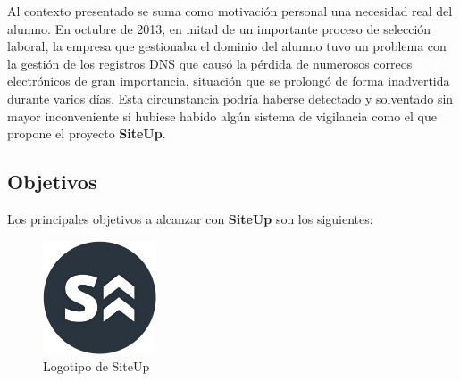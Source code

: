 \documentclass[a4paper,12pt]{article}
\begin{document}
Al contexto presentado se suma como motivación personal una necesidad real del
alumno. En octubre de 2013, en mitad de un importante proceso de selección
laboral, la empresa que gestionaba el dominio del alumno tuvo un problema con la
gestión de los registros DNS que causó la pérdida de numerosos correos
electrónicos de gran importancia, situación que se prolongó de forma inadvertida
durante varios días. Esta circunstancia podría haberse detectado y solventado
sin mayor inconveniente si hubiese habido algún sistema de vigilancia como el
que propone el proyecto \textbf{SiteUp}.

\subsection{Objetivos}
Los principales objetivos a alcanzar con \textbf{SiteUp} son los siguientes:

\begin{figure}[hbt]
  \centering
  \includegraphics[width=0.3\textwidth]{logo}
  \caption{Logotipo de SiteUp}
  \label{fig:logotipo}
\end{figure}
\end{document}
